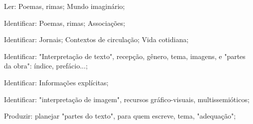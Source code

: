  Ler: Poemas, rimas; Mundo imaginário;

 Identificar: Poemas, rimas; Associações;

 Identificar: Jornais; Contextos de circulação; Vida cotidiana;

 Identificar: "Interpretação de texto", recepção, gênero, tema, imagens, e "partes da obra": índice, prefácio...;

 Identificar: Informações explícitas;

 Identificar: "interpretação de imagem", recursos gráfico-visuais, multissemióticos;

 Produzir: planejar "partes do texto", para quem escreve, tema, "adequação";

